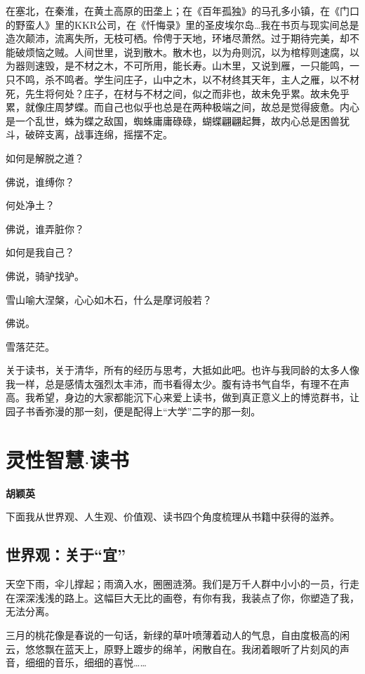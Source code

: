 \documentclass[openany,scheme = chinese, linespread = 1.5]{ctexbook}
\newcommand \name[1]{\begin{center} \kaishu \Large \bfseries #1 \end{center}}
\begin{document}
在塞北，在秦淮，在黄土高原的田垄上；在《百年孤独》的马孔多小镇，在《门口的野蛮人》里的KKR公司，在《忏悔录》里的圣皮埃尔岛…我在书页与现实间总是造次颠沛，流离失所，无枝可栖。伶俜于天地，环堵尽萧然。过于期待完美，却不能破烦恼之贼。人间世里，说到散木。散木也，以为舟则沉，以为棺椁则速腐，以为器则速毁，是不材之木，不可所用，能长寿。山木里，又说到雁，一只能鸣，一只不鸣，杀不鸣者。学生问庄子，山中之木，以不材终其天年，主人之雁，以不材死，先生将何处？庄子，在材与不材之间，似之而非也，故未免乎累。故未免乎累，就像庄周梦蝶。而自己也似乎也总是在两种极端之间，故总是觉得疲惫。内心是一个乱世，蛛为蝶之敌国，蜘蛛庸庸碌碌，蝴蝶翩翩起舞，故内心总是困兽犹斗，破碎支离，战事连绵，摇摆不定。
\begin{center}

如何是解脱之道？

佛说，谁缚你？

何处净土？

佛说，谁弄脏你？

如何是我自己？

佛说，骑驴找驴。

雪山喻大涅槃，心心如木石，什么是摩诃般若？

佛说。

雪落茫茫。
\end{center}

关于读书，关于清华，所有的经历与思考，大抵如此吧。也许与我同龄的太多人像我一样，总是感情太强烈太丰沛，而书看得太少。腹有诗书气自华，有理不在声高。我希望，身边的大家都能沉下心来爱上读书，做到真正意义上的博览群书，让园子书香弥漫的那一刻，便是配得上“大学”二字的那一刻。
\newpage

\section{灵性智慧$\cdot$读书}
\name{胡颖英}

下面我从世界观、人生观、价值观、读书四个角度梳理从书籍中获得的滋养。

\subsection*{世界观：关于“宜”}
天空下雨，伞儿撑起；雨滴入水，圈圈涟漪。我们是万千人群中小小的一员，行走在深深浅浅的路上。这幅巨大无比的画卷，有你有我，我装点了你，你塑造了我，无法分离。

三月的桃花像是春说的一句话，新绿的草叶喷薄着动人的气息，自由度极高的闲云，悠悠飘在蓝天上，原野上踱步的绵羊，闲散自在。我闭着眼听了片刻风的声音，细细的音乐，细细的喜悦……
\end{document}
